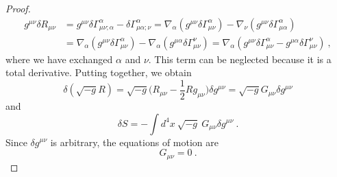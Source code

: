 \begin{proof}
\begin{equation*}
        \begin{aligned}
            g^{\mu\nu} \delta R_{\mu\nu} & = g^{\mu\nu} \delta \Gamma^{\alpha}_{\mu\nu;\alpha} - \delta \Gamma^{\alpha}_{\mu\alpha;\nu} = \nabla_\alpha (g^{\mu\nu} \delta \Gamma^{\alpha}_{\mu\nu} ) - \nabla_\nu (g^{\mu\nu} \delta \Gamma^{\alpha}_{\mu\alpha}) \\ & = \nabla_\alpha (g^{\mu\nu} \delta \Gamma^{\alpha}_{\mu\nu} ) - \nabla_\alpha (g^{\mu\alpha} \delta \Gamma^{\nu}_{\mu\nu}) = \nabla_\alpha (g^{\mu\nu} \delta \Gamma^{\alpha}_{\mu\nu} - g^{\mu\alpha} \delta \Gamma^{\nu}_{\mu\nu}) ~,
        \end{aligned}
        \end{equation*}
        where we have exchanged $\alpha$ and $\nu$. This term can be neglected because it is a total derivative.
        Putting together, we obtain 
        \begin{equation*}
            \delta(\sqrt{-g} R) = \sqrt{-g} \Big (R_{\mu\nu} - \frac{1}{2} R g_{\mu\nu} \Big) \delta g^{\mu\nu} = \sqrt{-g} G_{\mu\nu} \delta g^{\mu\nu}
        \end{equation*}
        and 
        \begin{equation*}
            \delta S = - \int d^4 x ~ \sqrt{-g} ~ G_{\mu\nu} \delta g^{\mu\nu} ~.
        \end{equation*}
        Since $\delta g^{\mu\nu}$ is arbitrary, the equations of motion are 
        \begin{equation*}
            G_{\mu\nu} = 0 ~.
        \end{equation*}
    \end{proof}

